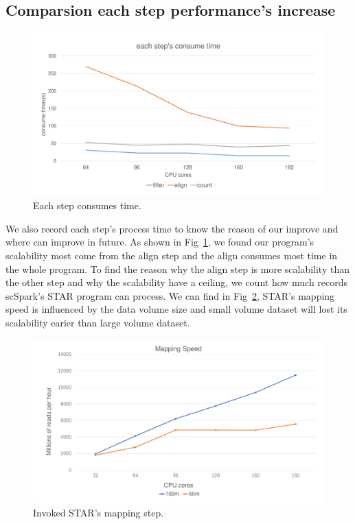 \documentclass[runningheads]{llncs}
\begin{document}
\subsection{Comparsion each step performance's increase}
\begin{figure}
  \includegraphics[width=\textwidth]{fig5.pdf}
  \caption{Each step consumes time.} \label{fig5}
\end{figure}
We also record each step's process time to know the reason of our improve and where can improve in future.
As shown in Fig~\ref{fig5}, we found our program's scalability most come from the align step and the align consumes most time in the whole program.
To find the reason why the align step is more scalability than the other step and why the scalability have a ceiling, we count how much records scSpark's STAR program can process.
We can find in Fig~\ref{fig6}, STAR's mapping speed is influenced by the data volume size and small volume dataset will lost its scalability earier than large volume dataset.
\begin{figure}
  \includegraphics[width=\textwidth]{fig6.pdf}
  \caption{Invoked STAR's mapping step.} \label{fig6}
\end{figure}
\end{document}
